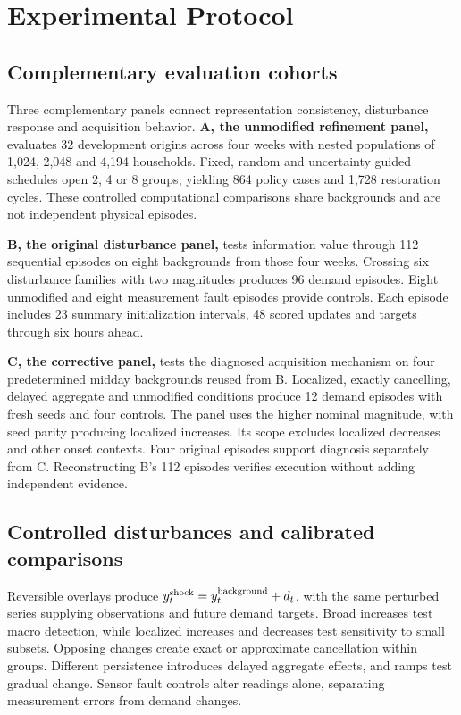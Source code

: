 \documentclass[conference]{IEEEtran}
\begin{document}
\section{Experimental Protocol}
\subsection{Complementary evaluation cohorts}
Three complementary panels connect representation consistency, disturbance response and acquisition behavior. \textbf{A, the unmodified refinement panel,} evaluates 32 development origins across four weeks with nested populations of 1,024, 2,048 and 4,194 households. Fixed, random and uncertainty guided schedules open 2, 4 or 8 groups, yielding 864 policy cases and 1,728 restoration cycles. These controlled computational comparisons share backgrounds and are not independent physical episodes.

\textbf{B, the original disturbance panel,} tests information value through 112 sequential episodes on eight backgrounds from those four weeks. Crossing six disturbance families with two magnitudes produces 96 demand episodes. Eight unmodified and eight measurement fault episodes provide controls. Each episode includes 23 summary initialization intervals, 48 scored updates and targets through six hours ahead.

\textbf{C, the corrective panel,} tests the diagnosed acquisition mechanism on four predetermined midday backgrounds reused from B. Localized, exactly cancelling, delayed aggregate and unmodified conditions produce 12 demand episodes with fresh seeds and four controls. The panel uses the higher nominal magnitude, with seed parity producing localized increases. Its scope excludes localized decreases and other onset contexts. Four original episodes support diagnosis separately from C. Reconstructing B's 112 episodes verifies execution without adding independent evidence.




\subsection{Controlled disturbances and calibrated comparisons}
Reversible overlays produce $y^{\rm shock}_t=y^{\rm background}_t+d_t$, with the same perturbed series supplying observations and future demand targets. Broad increases test macro detection, while localized increases and decreases test sensitivity to small subsets. Opposing changes create exact or approximate cancellation within groups. Different persistence introduces delayed aggregate effects, and ramps test gradual change. Sensor fault controls alter readings alone, separating measurement errors from demand changes.
\end{document}
